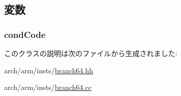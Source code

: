 \subsection{変数}
\hypertarget{classArmISA_1_1BranchImmCond64_a273dc0fe84de8f4a9cf52aaf8dc27885}{
\subsubsection[{condCode}]{ {\bf condCode}}}
\label{classArmISA_1_1BranchImmCond64_a273dc0fe84de8f4a9cf52aaf8dc27885}


このクラスの説明は次のファイルから生成されました:\begin{DoxyCompactItemize}
\item 
arch/arm/insts/\hyperlink{branch64_8hh}{branch64.hh}\item 
arch/arm/insts/\hyperlink{branch64_8cc}{branch64.cc}\end{DoxyCompactItemize}
